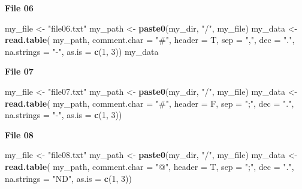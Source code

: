 \documentclass[]{book}
\newenvironment{Shaded}{\begin{snugshade}}{\end{snugshade}}
\newcommand{\DataTypeTok}[1]{\textcolor[rgb]{0.13,0.29,0.53}{#1}}
\newcommand{\DecValTok}[1]{\textcolor[rgb]{0.00,0.00,0.81}{#1}}
\newcommand{\KeywordTok}[1]{\textcolor[rgb]{0.13,0.29,0.53}{\textbf{#1}}}
\newcommand{\NormalTok}[1]{#1}
\newcommand{\StringTok}[1]{\textcolor[rgb]{0.31,0.60,0.02}{#1}}
\begin{document}
\textbf{File 06}

\begin{Shaded}
\begin{Highlighting}[]
\NormalTok{my_file <-}\StringTok{ "file06.txt"}
\NormalTok{my_path <-}\StringTok{ }\KeywordTok{paste0}\NormalTok{(my_dir, }\StringTok{"/"}\NormalTok{, my_file)}
\NormalTok{my_data <-}\StringTok{ }\KeywordTok{read.table}\NormalTok{(}
\NormalTok{    my_path,}
    \DataTypeTok{comment.char =} \StringTok{"#"}\NormalTok{,}
    \DataTypeTok{header =}\NormalTok{ T,}
    \DataTypeTok{sep =} \StringTok{","}\NormalTok{,}
    \DataTypeTok{dec =} \StringTok{"."}\NormalTok{,}
    \DataTypeTok{na.strings =} \StringTok{"-"}\NormalTok{,}
    \DataTypeTok{as.is =} \KeywordTok{c}\NormalTok{(}\DecValTok{1}\NormalTok{, }\DecValTok{3}\NormalTok{))}
\NormalTok{my_data}
\end{Highlighting}
\end{Shaded}

\textbf{File 07}

\begin{Shaded}
\begin{Highlighting}[]
\NormalTok{my_file <-}\StringTok{ "file07.txt"}
\NormalTok{my_path <-}\StringTok{ }\KeywordTok{paste0}\NormalTok{(my_dir, }\StringTok{"/"}\NormalTok{, my_file)}
\NormalTok{my_data <-}\StringTok{ }\KeywordTok{read.table}\NormalTok{(}
\NormalTok{    my_path,}
    \DataTypeTok{comment.char =} \StringTok{"#"}\NormalTok{,}
    \DataTypeTok{header =}\NormalTok{ F,}
    \DataTypeTok{sep =} \StringTok{";"}\NormalTok{,}
    \DataTypeTok{dec =} \StringTok{"."}\NormalTok{,}
    \DataTypeTok{na.strings =} \StringTok{"-"}\NormalTok{,}
    \DataTypeTok{as.is =} \KeywordTok{c}\NormalTok{(}\DecValTok{1}\NormalTok{, }\DecValTok{3}\NormalTok{))}
\end{Highlighting}
\end{Shaded}

\textbf{File 08}

\begin{Shaded}
\begin{Highlighting}[]
\NormalTok{my_file <-}\StringTok{ "file08.txt"}
\NormalTok{my_path <-}\StringTok{ }\KeywordTok{paste0}\NormalTok{(my_dir, }\StringTok{"/"}\NormalTok{, my_file)}
\NormalTok{my_data <-}\StringTok{ }\KeywordTok{read.table}\NormalTok{(}
\NormalTok{    my_path,}
    \DataTypeTok{comment.char =} \StringTok{"@"}\NormalTok{,}
    \DataTypeTok{header =}\NormalTok{ T,}
    \DataTypeTok{sep =} \StringTok{";"}\NormalTok{,}
    \DataTypeTok{dec =} \StringTok{"."}\NormalTok{,}
    \DataTypeTok{na.strings =} \StringTok{"ND"}\NormalTok{,}
    \DataTypeTok{as.is =} \KeywordTok{c}\NormalTok{(}\DecValTok{1}\NormalTok{, }\DecValTok{3}\NormalTok{))}
\end{Highlighting}
\end{Shaded}
\end{document}
